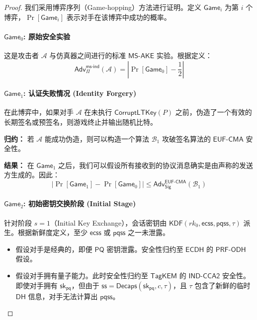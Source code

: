 \begin{proof}
我们采用博弈序列（Game-hopping）方法进行证明。定义 $\mathsf{Game}_i$ 为第 $i$ 个博弈，$\Pr[\mathsf{Game}_i]$ 表示对手在该博弈中成功的概率。

\paragraph{$\mathsf{Game}_0$: 原始安全实验}
这是攻击者 $\mathcal{A}$ 与仿真器之间进行的标准 $\mathsf{MS\text{-}AKE}$ 实验。根据定义：
\begin{equation}
    \mathsf{Adv}_{\Pi}^{\mathsf{ms\text{-}ind}}(\mathcal{A}) = \left| \Pr[\mathsf{Game}_0] - \frac{1}{2} \right|
\end{equation}

\paragraph{$\mathsf{Game}_1$: 认证失败情况 (Identity Forgery)}
在此博弈中，如果对手 $\mathcal{A}$ 在未执行 $\mathsf{CorruptLTKey}(P)$ 之前，伪造了一个有效的长期签名或预签名，则游戏终止并输出随机比特。

\textbf{归约：} 若 $\mathcal{A}$ 能成功伪造，则可以构造一个算法 $\mathcal{B}_1$ 攻破签名算法的 $\mathsf{EUF\text{-}CMA}$ 安全性。

\textbf{结果：} 在 $\mathsf{Game}_1$ 之后，我们可以假设所有接收到的协议消息确实是由声称的发送方生成的。因此：
\begin{equation}
    \left| \Pr[\mathsf{Game}_1] - \Pr[\mathsf{Game}_0] \right| \leq \mathsf{Adv}_{\mathsf{Sig}}^{\mathsf{EUF\text{-}CMA}}(\mathcal{B}_1)
\end{equation}

\paragraph{$\mathsf{Game}_2$: 初始密钥交换阶段 (Initial Stage)}
针对阶段 $s=1$（Initial Key Exchange），会话密钥由 $\mathsf{KDF}(rk_0, \mathsf{ecss}, \mathsf{pqss}, \tau)$ 派生。根据新鲜度定义，至少 $\mathsf{ecss}$ 或 $\mathsf{pqss}$ 之一未泄露。

\begin{itemize}[leftmargin=*]
    \item[\textbf{Case 2.1 (经典安全):}] 假设对手是经典的，即便 $\mathsf{PQ}$ 密钥泄露。安全性归约至 $\mathsf{ECDH}$ 的 $\mathsf{PRF\text{-}ODH}$ 假设。
    
    \item[\textbf{Case 2.2 (抗量子安全):}] 假设对手拥有量子能力。此时安全性归约至 $\mathsf{TagKEM}$ 的 $\mathsf{IND\text{-}CCA2}$ 安全性。即使对手拥有 $\mathsf{sk}_{\mathsf{pq}}$，但由于 $\mathsf{ss} = \mathsf{Decaps}(\mathsf{sk}_{\mathsf{pq}}, c, \tau)$，且 $\tau$ 包含了新鲜的临时 $\mathsf{DH}$ 信息，对手无法计算出 $\mathsf{pqss}$。
\end{itemize}


\end{proof}
